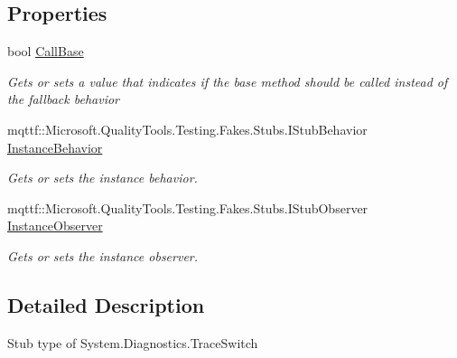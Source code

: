 \subsection*{Properties}
\begin{DoxyCompactItemize}
\item 
bool \hyperlink{class_system_1_1_diagnostics_1_1_fakes_1_1_stub_trace_switch_a6fe8150e5b3a3ad882b80f6dfc873fe1}{Call\-Base}
\begin{DoxyCompactList}\small\item\em Gets or sets a value that indicates if the base method should be called instead of the fallback behavior\end{DoxyCompactList}\item 
mqttf\-::\-Microsoft.\-Quality\-Tools.\-Testing.\-Fakes.\-Stubs.\-I\-Stub\-Behavior \hyperlink{class_system_1_1_diagnostics_1_1_fakes_1_1_stub_trace_switch_a6042ddda4869dc205d83eb67c82da5aa}{Instance\-Behavior}
\begin{DoxyCompactList}\small\item\em Gets or sets the instance behavior.\end{DoxyCompactList}\item 
mqttf\-::\-Microsoft.\-Quality\-Tools.\-Testing.\-Fakes.\-Stubs.\-I\-Stub\-Observer \hyperlink{class_system_1_1_diagnostics_1_1_fakes_1_1_stub_trace_switch_a6792dbf2d5dfa47ad6a00210dc47a73c}{Instance\-Observer}
\begin{DoxyCompactList}\small\item\em Gets or sets the instance observer.\end{DoxyCompactList}\end{DoxyCompactItemize}


\subsection{Detailed Description}
Stub type of System.\-Diagnostics.\-Trace\-Switch



